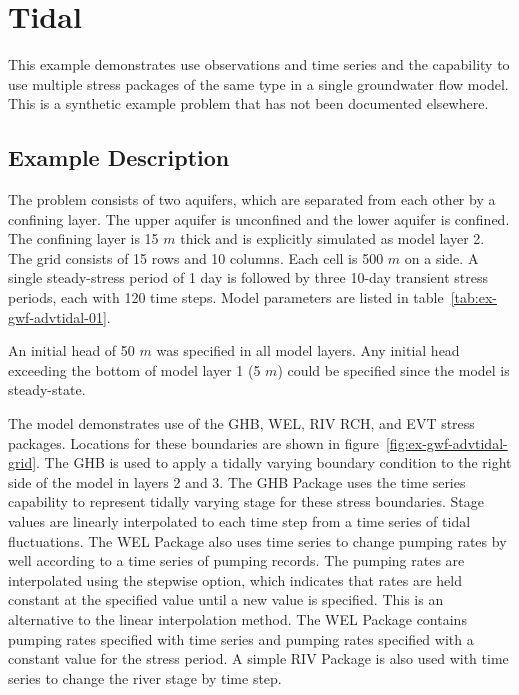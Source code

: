 \section{Tidal}

This example demonstrates use \mf observations and time series and the capability to use multiple stress packages of the same type in a single groundwater flow model.  This is a synthetic example problem that has not been documented elsewhere.

\subsection{Example Description}

The problem consists of two aquifers, which are separated from each other by a confining layer. The upper aquifer is unconfined and the lower aquifer is confined.  The confining layer is 15 $m$ thick and is explicitly simulated as model layer 2. The grid consists of 15 rows and 10 columns.  Each cell is 500 $m$ on a side.  A single steady-stress period of 1 day is followed by three 10-day transient stress periods, each with 120 time steps.  Model parameters are listed in table~\ref{tab:ex-gwf-advtidal-01}. 



An initial head of 50 $m$ was specified in all model layers. Any initial head exceeding the bottom of model layer 1 (5 $m$) could be specified since the model is steady-state.

The model demonstrates use of the GHB, WEL, RIV RCH, and EVT stress packages. Locations for these boundaries are shown in figure~\ref{fig:ex-gwf-advtidal-grid}. The GHB is used to apply a tidally varying boundary condition to the right side of the model in layers 2 and 3.  The GHB Package uses the time series capability to represent  tidally varying stage for these stress boundaries.  Stage values are linearly interpolated to each time step from a time series of tidal fluctuations.  The WEL Package also uses time series to change pumping rates by well according to a time series of pumping records.  The pumping rates are interpolated using the stepwise option, which indicates that rates are held constant at the specified value until a new value is specified.  This is an alternative to the linear interpolation method.  The WEL Package contains pumping rates specified with time series and pumping rates specified with a constant value for the stress period.  A simple RIV Package is also used with time series to change the river stage by time step.  

